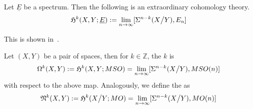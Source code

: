 \documentclass[a4paper,11pt]{article}
\begin{document}





    

\begin{theodef}\label{spectrum cohomology}
    Let \(\underline{E}\) be a spectrum. Then the following is an extraordinary cohomology theory.
    \[\mathfrak{H}^k(X,Y;\underline{E}):=\lim_{n\to\infty}[\Sigma^{n-k}(X\big/Y),E_n]\]
\end{theodef}

This is shown in\ \cite{whitehead}.

\begin{definition}
    Let \((X,Y)\) be a pair of spaces, then for \(k\in\mathbb{Z}\), the \(k\) is
    \[\Omega^k(X,Y):=\mathfrak{H}^k(X,Y;MSO)=\lim_{n\to\infty}[\Sigma^{n-k}(X\big/Y),MSO(n)]\]
    with respect to the above map.
    Analogously, we define the  as
    \[\mathfrak{N}^k(X,Y):= \mathfrak{H}^k(X\big/Y;MO)=\lim_{n\to\infty}[\Sigma^{n-k}(X\big/ Y),MO(n)]\]
\end{definition}
\end{document}

